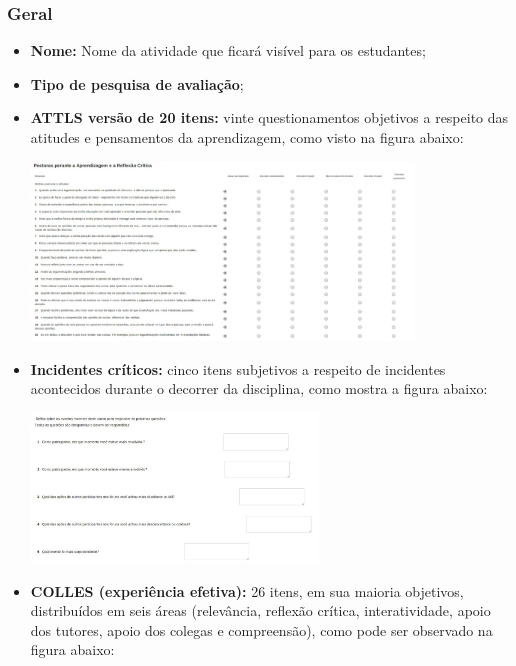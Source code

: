 \subsubsection{Geral}
\begin{itemize}
\item \textbf{Nome:} Nome da atividade que ficará visível para os estudantes;
\item \textbf{Tipo de pesquisa de avaliação};
\item \textbf{ATTLS versão de 20 itens:} vinte questionamentos objetivos a respeito das atitudes e pensamentos da aprendizagem, como visto na figura abaixo:

\begin{center}\includegraphics[width=0.8\textwidth]{imagem/cap5/fig60.jpg}\end{center}
\item \textbf{Incidentes críticos:} cinco itens subjetivos a respeito de incidentes acontecidos durante o decorrer da disciplina, como mostra a figura abaixo:

\begin{center} \includegraphics[width=0.6\textwidth]{imagem/cap5/fig61.jpg}\end{center}
\item \textbf{COLLES (experiência efetiva):} 26 itens, em sua maioria objetivos, distribuídos em seis áreas (relevância, reflexão crítica, interatividade, apoio dos tutores, apoio dos colegas e compreensão), como pode ser observado na figura abaixo:


\end{itemize}
